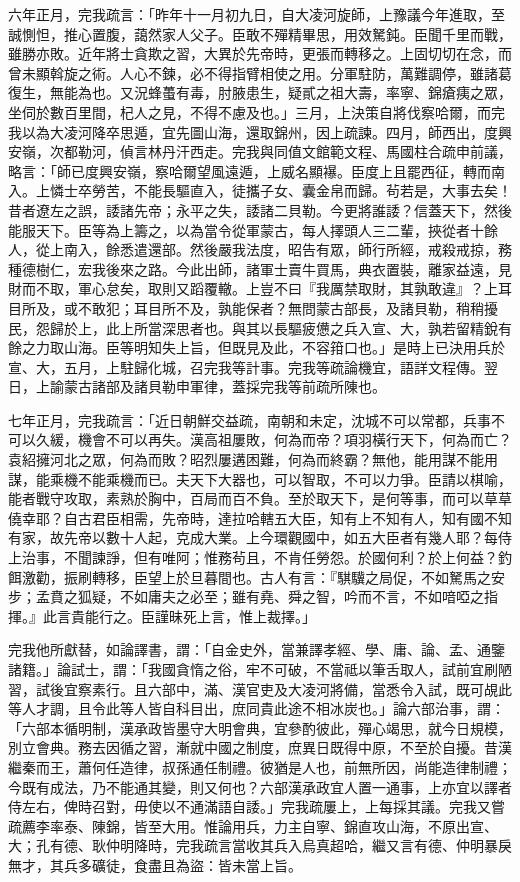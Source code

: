 \begin{pinyinscope}
六年正月，完我疏言：「昨年十一月初九日，自大凌河旋師，上豫議今年進取，至誠惻怛，推心置腹，藹然家人父子。臣敢不殫精畢思，用效駑鈍。臣聞千里而戰，雖勝亦敗。近年將士貪欺之習，大異於先帝時，更張而轉移之。上固切切在念，而曾未顯斡旋之術。人心不鍊，必不得指臂相使之用。分軍駐防，萬難調停，雖諸葛復生，無能為也。又況蜂蠆有毒，肘腋患生，疑貳之祖大壽，率寧、錦瘡痍之眾，坐伺於數百里間，杞人之見，不得不慮及也。」三月，上決策自將伐察哈爾，而完我以為大凌河降卒思遁，宜先圖山海，還取錦州，因上疏諫。四月，師西出，度興安嶺，次都勒河，偵言林丹汗西走。完我與同值文館範文程、馬國柱合疏申前議，略言：「師已度興安嶺，察哈爾望風遠遁，上威名顯襮。臣度上且罷西征，轉而南入。上憐士卒勞苦，不能長驅直入，徒攜子女、囊金帛而歸。茍若是，大事去矣！昔者遼左之誤，諉諸先帝；永平之失，諉諸二貝勒。今更將誰諉？信蓋天下，然後能服天下。臣等為上籌之，以為當令從軍蒙古，每人擇頭人三二輩，挾從者十餘人，從上南入，餘悉遣還部。然後嚴我法度，昭告有眾，師行所經，戒殺戒掠，務種德樹仁，宏我後來之路。今此出師，諸軍士賣牛買馬，典衣置裝，離家益遠，見財而不取，軍心怠矣，取則又蹈覆轍。上豈不曰『我厲禁取財，其孰敢違』？上耳目所及，或不敢犯；耳目所不及，孰能保者？無問蒙古部長，及諸貝勒，稍稍擾民，怨歸於上，此上所當深思者也。與其以長驅疲憊之兵入宣、大，孰若留精銳有餘之力取山海。臣等明知失上旨，但既見及此，不容箝口也。」是時上已決用兵於宣、大，五月，上駐歸化城，召完我等計事。完我等疏論機宜，語詳文程傳。翌日，上諭蒙古諸部及諸貝勒申軍律，蓋採完我等前疏所陳也。

七年正月，完我疏言：「近日朝鮮交益疏，南朝和未定，沈城不可以常都，兵事不可以久緩，機會不可以再失。漢高祖屢敗，何為而帝？項羽橫行天下，何為而亡？袁紹擁河北之眾，何為而敗？昭烈屢遘困難，何為而終霸？無他，能用謀不能用謀，能乘機不能乘機而已。夫天下大器也，可以智取，不可以力爭。臣請以棋喻，能者戰守攻取，素熟於胸中，百局而百不負。至於取天下，是何等事，而可以草草僥幸耶？自古君臣相需，先帝時，達拉哈轄五大臣，知有上不知有人，知有國不知有家，故先帝以數十人起，克成大業。上今環觀國中，如五大臣者有幾人耶？每侍上治事，不聞諫諍，但有唯阿；惟務茍且，不肯任勞怨。於國何利？於上何益？釣餌激勸，振刷轉移，臣望上於旦暮間也。古人有言：『騏驥之局促，不如駑馬之安步；孟賁之狐疑，不如庸夫之必至；雖有堯、舜之智，吟而不言，不如喑啞之指揮。』此言貴能行之。臣謹昧死上言，惟上裁擇。」

完我他所獻替，如論譯書，謂：「自金史外，當兼譯孝經、學、庸、論、孟、通鑒諸籍。」論試士，謂：「我國貪惰之俗，牢不可破，不當祗以筆舌取人，試前宜刷陋習，試後宜察素行。且六部中，滿、漢官吏及大凌河將備，當悉令入試，既可覘此等人才調，且令此等人皆自科目出，庶同貴此途不相冰炭也。」論六部治事，謂：「六部本循明制，漢承政皆墨守大明會典，宜參酌彼此，殫心竭思，就今日規模，別立會典。務去因循之習，漸就中國之制度，庶異日既得中原，不至於自擾。昔漢繼秦而王，蕭何任造律，叔孫通任制禮。彼猶是人也，前無所因，尚能造律制禮；今既有成法，乃不能通其變，則又何也？六部漢承政宜人置一通事，上亦宜以譯者侍左右，俾時召對，毋使以不通滿語自諉。」完我疏屢上，上每採其議。完我又嘗疏薦李率泰、陳錦，皆至大用。惟論用兵，力主自寧、錦直攻山海，不原出宣、大；孔有德、耿仲明降時，完我疏言當收其兵入烏真超哈，繼又言有德、仲明暴戾無才，其兵多礦徒，食盡且為盜：皆未當上旨。


\end{pinyinscope}
